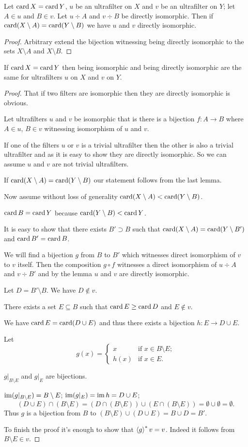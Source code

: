 \begin{lem}
Let $\operatorname{card} X=\operatorname{card} Y$, $u$ be an ultrafilter on $X$ and $v$ be
an ultrafilter on $Y$; let $A\in u$ and $B\in v$. Let $u\div A$
and $v\div B$ be directly isomorphic. Then if $\operatorname{card}(X\setminus A)=\operatorname{card}(Y\setminus B)$
we have $u$ and $v$ directly isomorphic.\end{lem}
\begin{proof}
Arbitrary extend the bijection witnessing being directly isomorphic
to the sets $X\setminus A$ and $X\setminus B$.\end{proof}
\begin{thm}
If $\operatorname{card} X=\operatorname{card} Y$ then being isomorphic and being directly isomorphic
are the same for ultrafilters $u$ on $X$ and $v$ on $Y$.\end{thm}
\begin{proof}
That if two filters are isomorphic then they are directly isomorphic
is obvious.

Let ultrafilters $u$ and $v$ be isomorphic that is there is a bijection
$f:A\rightarrow B$ where $A\in u$, $B\in v$ witnessing isomorphism
of $u$ and $v$.

If one of the filters $u$ or $v$ is a trivial ultrafilter then the
other is also a trivial ultrafilter and as it is easy to show they
are directly isomorphic. So we can assume $u$ and $v$ are not trivial
ultrafilters.

If $\operatorname{card}(X\setminus A)=\operatorname{card}(Y\setminus B)$ our statement follows
from the last lemma.

Now assume without loss of generality $\operatorname{card}(X\setminus A)<\operatorname{card}(Y\setminus B)$.

$\operatorname{card} B=\operatorname{card} Y$ because $\operatorname{card}(Y\setminus B)<\operatorname{card} Y$.

It is easy to show that there exists $B'\supset B$ such that $\operatorname{card}(X\setminus A)=\operatorname{card}(Y\setminus B')$
and $\operatorname{card} B'=\operatorname{card} B$.

We will find a bijection $g$ from $B$ to $B'$ which witnesses direct
isomorphism of $v$ to $v$ itself. Then the composition $g\circ f$
witnesses a direct isomorphism of $u\div A$ and $v\div B'$ and by
the lemma $u$ and $v$ are directly isomorphic.

Let $D=B'\setminus B$. We have $D\notin v$.

There exists a set $E\subseteq B$ such that $\operatorname{card} E\ge\operatorname{card} D$
and $E\notin v$.

We have $\operatorname{card} E=\operatorname{card}(D\cup E)$ and thus there exists a bijection
$h:E\rightarrow D\cup E$.

Let
\[
g(x)=\begin{cases}
x & \text{if }x\in B\setminus E;\\
h(x) & \text{if }x\in E.
\end{cases}
\]


$g|_{B\setminus E}$ and $g|_{E}$ are bijections.

$\operatorname{im}(g|_{B\setminus E})=B\setminus E$; $\operatorname{im}(g|_{E})=\operatorname{im} h=D\cup E$;
\[
(D\cup E)\cap(B\setminus E)=(D\cap(B\setminus E))\cup(E\cap(B\setminus E))=\emptyset\cup\emptyset=\emptyset.
\]
Thus $g$ is a bijection from $B$ to $(B\setminus E)\cup(D\cup E)=B\cup D=B'$.

To finish the proof it's enough to show that $\left\langle g\right\rangle ^{\ast}v=v$. Indeed
it follows from $B\setminus E\in v$.\end{proof}

